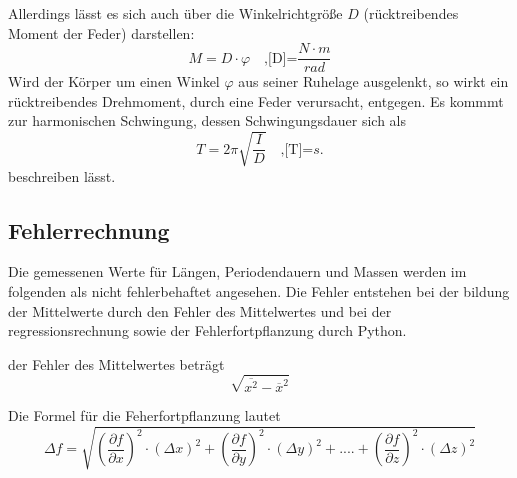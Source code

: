     \label{eqn:gl8}
Allerdings lässt es sich auch über die Winkelrichtgröße $D$ (rücktreibendes
Moment der Feder) darstellen:
\begin{equation}
    M = D \cdot \varphi \quad \text{,[D]=} \frac{N \cdot m}{rad}
    \label{eqn:gl9}
\end{equation}
Wird der Körper um einen Winkel $\varphi$ aus seiner Ruhelage ausgelenkt,
so wirkt ein rücktreibendes Drehmoment, durch eine Feder verursacht, 
entgegen. Es kommmt zur harmonischen Schwingung, dessen Schwingungsdauer
sich als
\begin{equation}
    T = 2 \pi \sqrt{\frac{I}{D}} \quad \text{,[T]=} s.
    \label{eqn:gl10}
\end{equation}
beschreiben lässt.
\cite{sample}

\subsection{Fehlerrechnung}
Die gemessenen Werte für Längen, Periodendauern und Massen werden im folgenden als nicht fehlerbehaftet 
angesehen. Die Fehler entstehen bei der bildung der Mittelwerte durch den Fehler des Mittelwertes und
bei der regressionsrechnung sowie der Fehlerfortpflanzung durch Python.

der Fehler des Mittelwertes beträgt
\begin{equation}
  \sqrt{\overline{x^2} - \overline{x}^2}
\end{equation}

Die Formel für die Feherfortpflanzung lautet
\begin{equation}
  \Delta f = \sqrt{\left(\frac{\partial f}{\partial x}\right)^2 \cdot \left(\Delta x\right)^2 + \left(\frac{\partial f}{\partial y}\right)^2 \cdot \left(\Delta y\right)^2 + .... + \left(\frac{\partial f}{\partial z}\right)^2 \cdot \left(\Delta z\right)^2}
\end{equation}